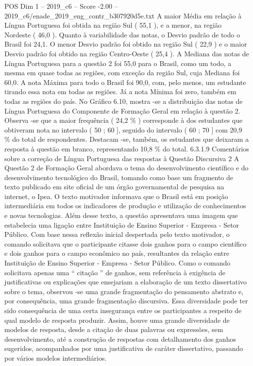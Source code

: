 \begin{textsample}{POS Dim 1 – 2019\_c6 – Score -2.00 – 2019\_c6/enade\_2019\_eng\_contr\_b307920d5e.txt}
A maior Média em relação à Língua Portuguesa foi obtida na região Sul ( 55,1 ), e a menor, na região Nordeste ( 46,0 ).
Quanto à variabilidade das notas, o Desvio padrão de todo o Brasil foi 24,1.
O menor Desvio padrão foi obtido na região Sul ( 22,9 ) e o maior Desvio padrão foi obtido na região Centro-Oeste ( 25,4 ).
A Mediana das notas de Língua Portuguesa para a questão 2 foi 55,0 para o Brasil, como um todo, a mesma em quase todas as regiões, com exceção da região Sul, cuja Mediana foi 60,0.
A nota Máxima para todo o Brasil foi 90,0, com, pelo menos, um estudante tirando essa nota em todas as regiões.
Já a nota Mínima foi zero, também em todas as regiões do país.
No Gráfico 6.10, mostra -se a distribuição das notas de Língua Portuguesa do Componente de Formação Geral em relação à questão 2.
Observa -se que a maior frequência ( 24,2 \% ) corresponde à dos estudantes que obtiveram nota no intervalo ( 50 ; 60 ], seguido do intervalo ( 60 ; 70 ] com 20,9 \% do total de respondentes.
Destacam -se, também, os estudantes que deixaram a resposta à questão em branco, representando 10,8 \% do total. 6.3.1.9 Comentários sobre a correção de Língua Portuguesa das respostas à Questão Discursiva 2 A Questão 2 de Formação Geral abordava o tema do desenvolvimento científico e do desenvolvimento tecnológico do Brasil, tomando como base um fragmento de texto publicado em site oficial de um órgão governamental de pesquisa na internet, o Ipea.
O texto motivador informava que o Brasil está em posição intermediária em todos os indicadores de produção e utilização de conhecimentos e novas tecnologias.
Além desse texto, a questão apresentava uma imagem que estabelecia uma ligação entre Instituição de Ensino Superior - Empresa - Setor Público.
Com base nessa reflexão inicial despertada pelo texto motivador, o comando solicitava que o participante citasse dois ganhos para o campo científico e dois ganhos para o campo econômico no país, resultantes da relação entre Instituição de Ensino Superior - Empresa - Setor Público.
Como o comando solicitava apenas uma “ citação ” de ganhos, sem referência à exigência de justificativas ou explicações que ensejariam a elaboração de um texto dissertativo sobre o tema, observou -se uma grande fragmentação do pensamento abstrato e, por consequência, uma grande fragmentação discursiva.
Essa diversidade pode ter sido consequência de uma certa insegurança entre os participantes a respeito de qual modelo de resposta produzir.
Assim, houve uma grande diversidade de modelos de resposta, desde a citação de duas palavras ou expressões, sem desenvolvimento, até a construção de respostas com detalhamento dos ganhos sugeridos, acompanhados por uma justificativa de caráter dissertativo, passando por vários modelos intermediários.

\end{textsample}
